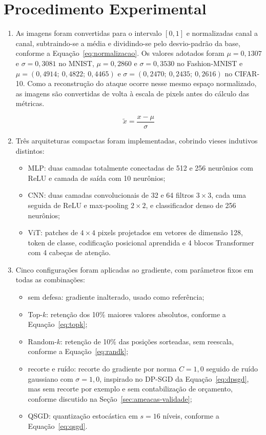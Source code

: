 \section{Procedimento Experimental} \label{sec:passos}

\begin{enumerate}
  \item As imagens foram convertidas para o intervalo $[0, 1]$ e normalizadas canal a canal, subtraindo-se a média e dividindo-se pelo desvio-padrão da base, conforme a Equação~\ref{eq:normalizacao}. Os valores adotados foram $\mu = 0{,}1307$ e $\sigma = 0{,}3081$ no MNIST, $\mu = 0{,}2860$ e $\sigma = 0{,}3530$ no Fashion-MNIST e $\mu = (0{,}4914;\ 0{,}4822;\ 0{,}4465)$ e $\sigma = (0{,}2470;\ 0{,}2435;\ 0{,}2616)$ no CIFAR-10. Como a reconstrução do ataque ocorre nesse mesmo espaço normalizado, as imagens são convertidas de volta à escala de pixels antes do cálculo das métricas.

  \begin{equation} \label{eq:normalizacao}
  \tilde{x} = \frac{x - \mu}{\sigma}
  \end{equation}

  \item Três arquiteturas compactas foram implementadas, cobrindo vieses indutivos distintos:
  \begin{itemize}
    \item MLP: duas camadas totalmente conectadas de 512 e 256 neurônios com ReLU e camada de saída com 10 neurônios;
    \item CNN: duas camadas convolucionais de 32 e 64 filtros $3 \times 3$, cada uma seguida de ReLU e max-pooling $2 \times 2$, e classificador denso de 256 neurônios;
    \item ViT: patches de $4 \times 4$ pixels projetados em vetores de dimensão 128, token de classe, codificação posicional aprendida e 4 blocos Transformer com 4 cabeças de atenção.
  \end{itemize}

  \item Cinco configurações foram aplicadas ao gradiente, com parâmetros fixos em todas as combinações:
  \begin{itemize}
    \item sem defesa: gradiente inalterado, usado como referência;
    \item Top-$k$: retenção dos 10\% maiores valores absolutos, conforme a Equação~\ref{eq:topk};
    \item Random-$k$: retenção de 10\% das posições sorteadas, sem reescala, conforme a Equação~\ref{eq:randk};
    \item recorte e ruído: recorte do gradiente por norma $C = 1{,}0$ seguido de ruído gaussiano com $\sigma = 1{,}0$, inspirado no DP-SGD da Equação~\ref{eq:dpsgd}, mas sem recorte por exemplo e sem contabilização de orçamento, conforme discutido na Seção~\ref{sec:ameacas-validade};
    \item QSGD: quantização estocástica em $s = 16$ níveis, conforme a Equação~\ref{eq:qsgd}.
  \end{itemize}


\end{enumerate}
